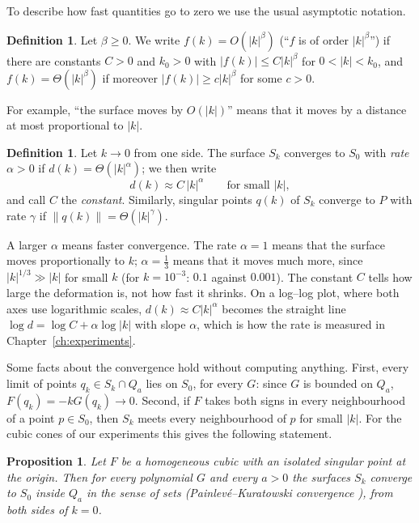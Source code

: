 \documentclass[12pt, a4paper, oneside]{book}
\theoremstyle{plain}
\newtheorem{proposition}[theorem]{Proposition}
\theoremstyle{definition}
\newtheorem{definition}[theorem]{Definition}
\theoremstyle{remark}
\theoremstyle{definition}
\begin{document}
To describe how fast quantities go to zero we use the usual asymptotic notation.

\begin{definition}
\label{def:bigO}
Let $\beta\ge0$. We write $f(k)=O(|k|^\beta)$ (``$f$ is of order $|k|^\beta$'') if there are constants $C>0$ and $k_0>0$ with $|f(k)|\le C|k|^\beta$ for $0<|k|<k_0$, and $f(k)=\Theta(|k|^\beta)$ if moreover $|f(k)|\ge c|k|^\beta$ for some $c>0$.
\end{definition}

For example, ``the surface moves by $O(|k|)$'' means that it moves by a distance at most proportional to $|k|$.

\begin{definition}
\label{def:rate}
Let $k\to0$ from one side. The surface $S_k$ converges to $S_0$ with \emph{rate} $\alpha>0$ if $d(k)=\Theta(|k|^\alpha)$; we then write
\[
d(k)\approx C\,|k|^\alpha\qquad\text{for small }|k|,
\]
and call $C$ the \emph{constant}. Similarly, singular points $q(k)$ of $S_k$ converge to $P$ with rate $\gamma$ if $\|q(k)\|=\Theta(|k|^\gamma)$.
\end{definition}

A larger $\alpha$ means faster convergence. The rate $\alpha=1$ means that the surface moves proportionally to $k$; $\alpha=\tfrac13$ means that it moves much more, since $|k|^{1/3}\gg|k|$ for small $k$ (for $k=10^{-3}$: $0.1$ against $0.001$). The constant $C$ tells how large the deformation is, not how fast it shrinks. On a log--log plot, where both axes use logarithmic scales, $d(k)\approx C|k|^\alpha$ becomes the straight line $\log d=\log C+\alpha\log|k|$ with slope $\alpha$, which is how the rate is measured in Chapter~\ref{ch:experiments}.

Some facts about the convergence hold without computing anything. First, every limit of points $q_k\in S_k\cap Q_a$ lies on $S_0$, for every $G$: since $G$ is bounded on $Q_a$, $F(q_k)=-kG(q_k)\to0$. Second, if $F$ takes both signs in every neighbourhood of a point $p\in S_0$, then $S_k$ meets every neighbourhood of $p$ for small $|k|$. For the cubic cones of our experiments this gives the following statement.

\begin{proposition}
\label{prop:set-convergence}
Let $F$ be a homogeneous cubic with an isolated singular point at the origin. Then for every polynomial $G$ and every $a>0$ the surfaces $S_k$ converge to $S_0$ inside $Q_a$ in the sense of sets (Painlevé--Kuratowski convergence \cite{rockafellar1998variational}), from both sides of $k=0$.
\end{proposition}
\end{document}
